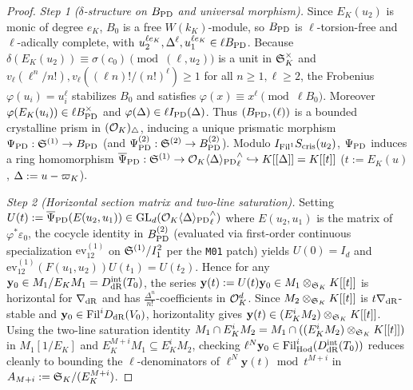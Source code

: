 \begin{proof}
\emph{Step 1 ($\delta$-structure on $B_{\mathrm{PD}}$ and universal morphism).} Since $E_K(u_2)$ is monic of degree $e_K$, $B_0$ is a free $W(k_K)$-module, so $B_{\mathrm{PD}}$ is $\ell$-torsion-free and $\ell$-adically complete, with $u_2^{\ell e_K}, \Delta^\ell, u_1^{\ell e_K} \in \ell B_{\mathrm{PD}}$. Because $\delta(E_K(u_2)) \equiv \sigma(c_0) \pmod{(\ell, u_2)}$ is a unit in $\mathfrak{S}_K^\times$ and $v_\ell(\ell^n/n!), v_\ell((\ell n)!/(n!)^\ell) \ge 1$ for all $n \ge 1, \ell \ge 2$, the Frobenius $\varphi(u_i) = u_i^\ell$ stabilizes $B_0$ and satisfies $\varphi(x) \equiv x^\ell \pmod{\ell B_0}$. Moreover $\varphi(E_K(u_i)) \in \ell B_{\mathrm{PD}}^\times$ and $\varphi(\Delta) \in \ell I_{\mathrm{PD}}(\Delta)$. Thus $(B_{\mathrm{PD}}, (\ell))$ is a bounded crystalline prism in $(\mathcal{O}_K)_\triangle$, inducing a unique prismatic morphism $\Psi_{\mathrm{PD}} : \mathfrak{S}^{(1)} \to B_{\mathrm{PD}}$ (and $\Psi_{\mathrm{PD}}^{(2)} : \mathfrak{S}^{(2)} \to B_{\mathrm{PD}}^{(2)}$). Modulo $I_{\mathrm{Fil}^1} S_{\mathrm{cris}}(u_2)$, $\Psi_{\mathrm{PD}}$ induces a ring homomorphism $\overline{\Psi}_{\mathrm{PD}} : \mathfrak{S}^{(1)} \to \mathcal{O}_K{\langle \Delta \rangle_{\mathrm{PD}}}^\wedge_\ell \hookrightarrow K[[\Delta]] = K[[t]]$ ($t := E_K(u)$, $\Delta := u - \varpi_K$).

\emph{Step 2 (Horizontal section matrix and two-line saturation).} Setting $U(t) := \overline{\Psi}_{\mathrm{PD}}(E(u_2, u_1)) \in \mathrm{GL}_d(\mathcal{O}_K{\langle \Delta \rangle_{\mathrm{PD}}}^\wedge_\ell)$ where $E(u_2, u_1)$ is the matrix of $\varphi^*\varepsilon_0$, the cocycle identity in $B_{\mathrm{PD}}^{(2)}$ (evaluated via first-order continuous specialization $\mathrm{ev}_{12}^{(1)}$ on $\mathfrak{S}^{(1)}/I_1^2$ per the \texttt{M01} patch) yields $U(0) = I_d$ and $\mathrm{ev}_{12}^{(1)}(F(u_1, u_2)) U(t_1) = U(t_2)$. Hence for any $\mathbf{y}_0 \in M_1/E_K M_1 = D_{\mathrm{dR}}^{\mathrm{int}}(T_0)$, the series $\mathbf{y}(t) := U(t)\mathbf{y}_0 \in M_1 \otimes_{\mathfrak{S}_K} K[[t]]$ is horizontal for $\nabla_{\mathrm{dR}}$ and has $\frac{\Delta^n}{n!}$-coefficients in $\mathcal{O}_K^d$. Since $M_2 \otimes_{\mathfrak{S}_K} K[[t]]$ is $t\nabla_{\mathrm{dR}}$-stable and $\mathbf{y}_0 \in \mathrm{Fil}^i D_{\mathrm{dR}}(V_0)$, horizontality gives $\mathbf{y}(t) \in (E_K^i M_2) \otimes_{\mathfrak{S}_K} K[[t]]$. Using the two-line saturation identity $M_1 \cap E_K^i M_2 = M_1 \cap ((E_K^i M_2) \otimes_{\mathfrak{S}_K} K[[t]])$ in $M_1[1/E_K]$ and $E_K^{M+i} M_1 \subseteq E_K^i M_2$, checking $\ell^N \mathbf{y}_0 \in \mathrm{Fil}^i_{\mathrm{Hod}}(D_{\mathrm{dR}}^{\mathrm{int}}(T_0))$ reduces cleanly to bounding the $\ell$-denominators of $\ell^N \mathbf{y}(t) \bmod t^{M+i}$ in $A_{M+i} := \mathfrak{S}_K/(E_K^{M+i})$.


\end{proof}
